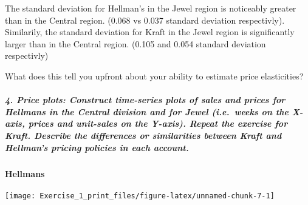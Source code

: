 \documentclass[]{article}
\newenvironment{Shaded}{\begin{snugshade}}{\end{snugshade}}
\newcommand{\DataTypeTok}[1]{\textcolor[rgb]{0.13,0.29,0.53}{#1}}
\newcommand{\KeywordTok}[1]{\textcolor[rgb]{0.13,0.29,0.53}{\textbf{#1}}}
\newcommand{\NormalTok}[1]{#1}
\newcommand{\OperatorTok}[1]{\textcolor[rgb]{0.81,0.36,0.00}{\textbf{#1}}}
\newcommand{\StringTok}[1]{\textcolor[rgb]{0.31,0.60,0.02}{#1}}
\let\oldparagraph\paragraph
\renewcommand{\paragraph}[1]{\oldparagraph{#1}\mbox{}}
\let\oldsubparagraph\subparagraph
\renewcommand{\subparagraph}[1]{\oldsubparagraph{#1}\mbox{}}
\begin{document}
\begin{Shaded}
\end{Shaded}

The standard deviation for Hellman's in the Jewel region is noticeably
greater than in the Central region. (0.068 vs 0.037 standard deviation
respectivly). Similarily, the standard deviation for Kraft in the Jewel
region is significantly larger than in the Central region. (0.105 and
0.054 standard deviation respectivly)

What does this tell you upfront about your ability to estimate price
elasticities?

\hypertarget{price-plots-construct-time-series-plots-of-sales-and-prices-for-hellmans-in-the-central-division-and-for-jewel-i.e.weeks-on-the-x-axis-prices-and-unit-sales-on-the-y-axis.-repeat-the-exercise-for-kraft.-describe-the-differences-or-similarities-between-kraft-and-hellmans-pricing-policies-in-each-account.}{%
\subparagraph{4. Price plots: Construct time-series plots of sales and
prices for Hellmans in the Central division and for Jewel (i.e.~weeks on
the X-axis, prices and unit-sales on the Y-axis). Repeat the exercise
for Kraft. Describe the differences or similarities between Kraft and
Hellman's pricing policies in each
account.}\label{price-plots-construct-time-series-plots-of-sales-and-prices-for-hellmans-in-the-central-division-and-for-jewel-i.e.weeks-on-the-x-axis-prices-and-unit-sales-on-the-y-axis.-repeat-the-exercise-for-kraft.-describe-the-differences-or-similarities-between-kraft-and-hellmans-pricing-policies-in-each-account.}}

\hypertarget{hellmans-1}{%
\paragraph{Hellmans}\label{hellmans-1}}

\begin{center}\texttt{[image: Exercise\_1\_print\_files/figure-latex/unnamed-chunk-7-1]} \end{center}
\end{document}
